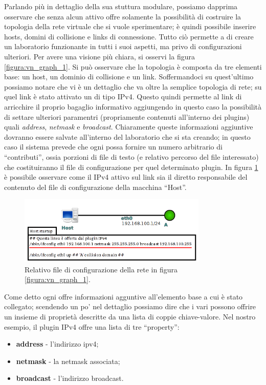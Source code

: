 Parlando più in dettaglio della sua stuttura modulare, possiamo dapprima osservare che \visualnetkit{} senza alcun \plugin{} attivo offre solamente la possibilità di costruire la topologia della rete virtuale che si vuole sperimentare; è quindi possibile inserire hosts, domini di collisione e links di connessione. Tutto ciò permette a \visualnetkit{} di creare un laboratorio funzionante in tutti i suoi aspetti, ma privo di configurazioni ulteriori.
Per avere una visione più chiara, si osservi la figura \ref{figura:vn_graph_1}. Si può osservare che la topologia è composta da tre elementi base: un host, un dominio di collisione e un link. Soffermandoci su quest'ultimo possiamo notare che vi è un dettaglio che va oltre la semplice topologia di rete; su quel link è stato attivato un \plugin{} di tipo IPv4. Questo quindi permette al link di arricchire il proprio bagaglio informativo aggiungendo in questo caso la possibilità di settare ulteriori paramentri (propriamente contenuti all'interno dei plugins) quali \emph{address}, \emph{netmask} e \emph{broadcast}. Chiaramente queste informazioni aggiuntive dovranno essere salvate all'interno del laboratorio che si sta creando; in questo caso il sistema prevede che ogni \plugin{} possa fornire un numero arbitrario di ``contributi'', ossia porzioni di file di testo (e relativo percorso del file interessato) che costituiranno il file di configurazione per quel determinato plugin. In figura \ref{figura:vn_graph_2} è possibile osservare come il \plugin{} IPv4 attivo sul link sia il diretto responsabile del contenuto del file di configurazione della macchina ``Host''.

\begin{figure}[!ht]
	\centering
	\includegraphics[width=9cm]{images/visualnetkit_graph_2.png}
	\caption{Relativo file di configurazione della rete in figura \ref{figura:vn_graph_1}.}
	\label{figura:vn_graph_2}
\end{figure}

Come detto ogni \plugin{} offre informazioni agguntive all'elemento base a cui è stato collegato; scendendo un po' nel dettaglio possiamo dire che i vari \plugin{} possono offrire un insieme di proprietà descritte da una lista di coppie chiave-valore. Nel nostro esempio, il plugin IPv4 offre una lista di tre ``property'':
\begin{itemize}
	\item \textbf{address} - l'indirizzo ipv4;
	\item \textbf{netmask} - la netmask associata;
	\item \textbf{broadcast} - l'indirizzo broadcast.
\end{itemize}

